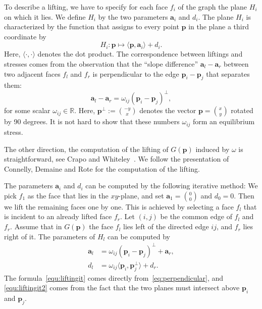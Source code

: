 \documentclass{article}
\theoremstyle{plain} \newtheorem{thm}{Theorem}[section]
\newcommand{\p}{\mathbf{p}}
\begin{document}
To describe a lifting, we have to specify for each face $f_{i}$ of the
graph the plane $H_{i}$ on which it lies.
 We define $H_i$ by the two
parameters $\mathbf{a}_i$ and $d_i$. The plane $H_i$ is characterized
by the function that assigns to every point $\p$ in the plane a third coordinate by
\begin{equation}
  \label{eq:plane}
H_i\colon \mathbf{p}\mapsto \langle \mathbf{p},\mathbf{a}_i\rangle +
d_i.  
\end{equation}
Here, $\langle \cdot ,\cdot \rangle$ denotes the dot product.
The correspondence between liftings and stresses comes from the
observation that the ``slope difference'' $\mathbf{a}_l-\mathbf{a}_r$
between two adjacent faces $f_l$ and $f_r$ is perpendicular to the
edge $\mathbf{p}_i-\mathbf{p}_j$ that separates them:
\begin{equation}
  \label{eq:perpendicular}
    \mathbf{a}_l-\mathbf{a}_r  =  \omega_{ij}
(\mathbf{p}_i-\mathbf{p}_j)^\perp,
\end{equation}
for some scalar $\omega_{ij}\in \mathbb{R}$.
Here, $\p^{\bot}:=\binom{-y}x$ denotes the vector $\p=\binom xy$
rotated by 90 degrees.
It is not hard to show that these numbers $\omega_{ij}$ form an
equilibrium stress.

The other direction, the computation of the lifting of $G(\p)$ induced by $\omega$ is straightforward,
see Crapo and Whiteley~\cite{cw-psspp-93}.
We follow the presentation of  Connelly, Demaine and Rote \cite{cdr-spcpc-03} for the computation of the lifting. 

The parameters $\mathbf{a}_i$ and $d_i$ can be computed by the following iterative method:
We pick $f_{1}$ as the face that lies in the $xy$-plane, and set $\mathbf{a}_1=\binom00$ and $d_0=0$. Then we lift the remaining faces one by one. This is achieved by selecting a face $f_{l}$ that is incident to an already lifted face $f_{r}$. 
Let $(i,j)$ be the common edge of $f_{l}$ and $f_{r}$. Assume that in $G(\p)$ the face  $f_{l}$ lies left of the  directed edge $ij$, and $f_{r}$ lies right of it. The parameters of $H_{l}$ can be computed by
 \begin{align}\label{equ:liftingit}
  \mathbf{a}_l & =  \omega_{ij}
(\mathbf{p}_i-\mathbf{p}_j)^\bot + \mathbf{a}_r, \\\label{equ:liftingit2}
d_l &=  \omega_{ij}\langle
\mathbf{p}_i,\mathbf{p}_j^\bot\rangle+d_r.
\end{align}
The formula~\eqref{equ:liftingit} comes directly from~\eqref{eq:perpendicular}, and
\eqref{equ:liftingit2} comes from the fact that the two planes must intersect above $\p_i$ and $\p_j$.
\end{document}
